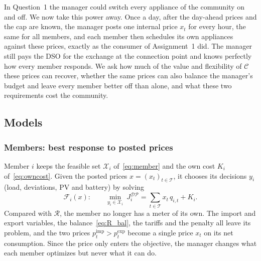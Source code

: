 In Question~1 the manager could switch every appliance of the community on and off.
We now take this power away.
Once a day, after the day-ahead prices and the cap are known, the manager posts one internal price $x_t$ for every hour, the same for all members, and each member then schedules its own appliances against these prices, exactly as the consumer of Assignment~1 did.
The manager still pays the DSO for the exchange at the connection point and knows perfectly how every member responds.
We ask how much of the value and flexibility of $\mathcal{C}$ these prices can recover, whether the same prices can also balance the manager's budget and leave every member better off than alone, and what these two requirements cost the community.

\subsection{Models}

\subsubsection{Members: best response to posted prices}
Member $i$ keeps the feasible set $\mathcal{X}_i$ of~\eqref{eq:member} and the own cost $K_i$ of~\eqref{eq:owncost}.
Given the posted prices $x=(x_t)_{t\in\mathcal{T}}$, it chooses its decisions $y_i$ (load, deviations, PV and battery) by solving
\begin{equation}\label{eq:DP_member}
\mathcal{F}_i(x):\qquad \min_{y_i\in\mathcal{X}_i}\ J^{\mathcal{DP}}_i=\sum_{t\in\mathcal{T}}x_t\,q_{i,t}+K_i .
\end{equation}
Compared with $\mathcal{R}$, the member no longer has a meter of its own.
The import and export variables, the balance~\eqref{eq:R_bal}, the tariffs and the penalty all leave its problem, and the two prices $p^{\mathrm{imp}}_t>p^{\mathrm{exp}}_t$ become a single price $x_t$ on its net consumption.
Since the price only enters the objective, the manager changes what each member optimizes but never what it can do.

